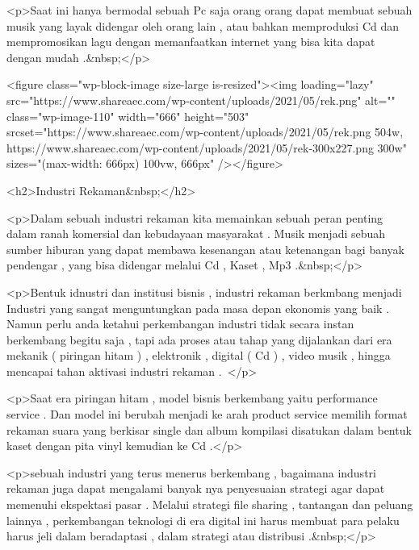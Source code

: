 <p>Saat ini hanya bermodal sebuah Pc saja orang orang dapat membuat sebuah musik yang layak didengar oleh orang lain , atau bahkan memproduksi Cd dan mempromosikan lagu dengan memanfaatkan internet yang bisa kita dapat dengan mudah .&nbsp;</p>



<figure class="wp-block-image size-large is-resized"><img loading="lazy" src="https://www.shareaec.com/wp-content/uploads/2021/05/rek.png" alt="" class="wp-image-110" width="666" height="503" srcset="https://www.shareaec.com/wp-content/uploads/2021/05/rek.png 504w, https://www.shareaec.com/wp-content/uploads/2021/05/rek-300x227.png 300w" sizes="(max-width: 666px) 100vw, 666px" /></figure>



<h2>Industri Rekaman&nbsp;</h2>



<p>Dalam sebuah industri rekaman kita memainkan sebuah peran penting dalam ranah komersial dan kebudayaan masyarakat . Musik menjadi sebuah sumber hiburan yang dapat membawa kesenangan atau ketenangan bagi banyak pendengar , yang bisa didengar melalui Cd , Kaset , Mp3 .&nbsp;</p>



<p>Bentuk idnustri dan institusi bisnis , industri rekaman berkmbang menjadi Industri yang sangat menguntungkan pada masa depan ekonomis yang baik . Namun perlu anda ketahui perkembangan industri tidak secara instan berkembang begitu saja , tapi ada proses atau tahap yang dijalankan dari era mekanik ( piringan hitam ) , elektronik , digital ( Cd ) , video musik , hingga mencapai tahan aktivasi industri rekaman . </p>



<p>Saat era piringan hitam , model bisnis berkembang yaitu performance service . Dan model ini berubah menjadi ke arah product service memilih format rekaman suara yang berkisar single dan album kompilasi disatukan dalam bentuk kaset dengan pita vinyl kemudian ke Cd .</p>



<p>sebuah industri yang terus menerus berkembang , bagaimana industri rekaman juga dapat mengalami banyak nya penyesuaian strategi agar dapat memenuhi ekspektasi pasar . Melalui strategi file sharing , tantangan dan peluang lainnya , perkembangan teknologi di era digital ini harus membuat para pelaku harus jeli dalam beradaptasi , dalam strategi atau distribusi .&nbsp;</p>



